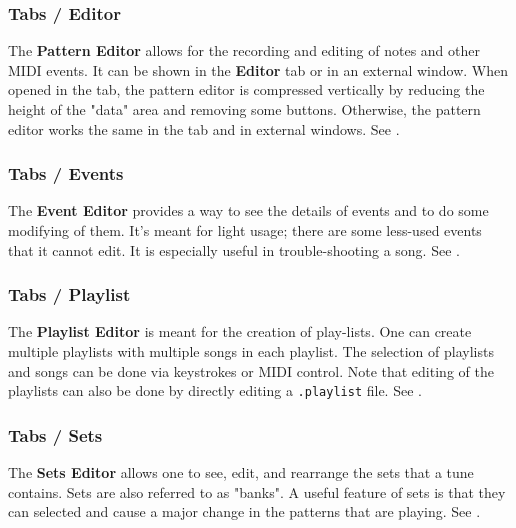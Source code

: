 \subsubsection{Tabs / Editor}
\label{subsubsec:introduction_main_tabs_editor}

   The \textbf{Pattern Editor} allows for the recording and editing of
   notes and other MIDI events.
   It can be shown in the \textbf{Editor} tab or in an
   external window.  When opened in the tab, the pattern editor is compressed
   vertically by reducing the height of the "data" area and removing some
   buttons.  Otherwise, the pattern editor works the same in the tab and in
   external windows.
   See .

\subsubsection{Tabs / Events}
\label{subsubsec:introduction_main_tabs_events}

   The \textbf{Event Editor} provides a way to see the details of events
   and to do some modifying of them.  It's meant for light usage; there are
   some less-used events that it cannot edit.
   It is especially useful in trouble-shooting a song.
   See .

\subsubsection{Tabs / Playlist}
\label{subsubsec:introduction_main_tabs_playlist}

   The \textbf{Playlist Editor} is meant for the creation of
   play-lists.  One can create multiple playlists with multiple songs in each
   playlist.  The selection of playlists and songs can be done via keystrokes
   or MIDI control.
   Note that editing of the playlists can also be done by directly editing a
   \texttt{.playlist} file.  See .

\subsubsection{Tabs / Sets}
\label{subsubsec:introduction_main_tabs_sets}

   The \textbf{Sets Editor} allows one to see, edit, and rearrange the sets
   that a tune contains.  Sets are also referred to as "banks".
   A useful feature of sets is that they can selected and cause a major change
   in the patterns that are playing.
   See .

